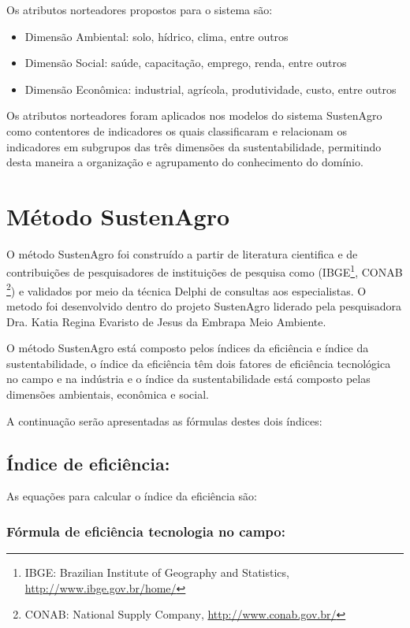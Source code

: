 Os atributos norteadores propostos para o sistema são:
\begin{itemize}
\item Dimensão Ambiental: solo, hídrico, clima, entre outros
\item Dimensão Social: saúde, capacitação, emprego, renda, entre outros
\item Dimensão Econômica: industrial, agrícola, produtividade, custo, entre
outros
\end{itemize}
Os atributos norteadores foram aplicados nos modelos do sistema SustenAgro
como contentores de indicadores os quais classificaram e relacionam
os indicadores em subgrupos das três dimensões da sustentabilidade,
permitindo desta maneira a organização e agrupamento do conhecimento
do domínio.

\section{Método SustenAgro}

O método SustenAgro foi construído a partir de literatura cientifica
e de contribuições de pesquisadores de instituições de pesquisa como
(IBGE\footnote{IBGE: \foreignlanguage{english}{Brazilian Institute of Geography and
Statistics}, \url{http://www.ibge.gov.br/home/}}, CONAB \footnote{CONAB: \foreignlanguage{english}{National Supply Company}, \url{http://www.conab.gov.br/}})
e validados por meio da técnica \foreignlanguage{english}{Delphi}
de consultas aos especialistas. O metodo foi desenvolvido dentro do
projeto SustenAgro liderado pela pesquisadora Dra. Katia Regina Evaristo
de Jesus da Embrapa Meio Ambiente.

O método SustenAgro está composto pelos índices da eficiência e índice
da sustentabilidade, o índice da eficiência têm dois fatores de eficiência
tecnológica no campo e na indústria e o índice da sustentabilidade
está composto pelas dimensões ambientais, econômica e social.

A continuação serão apresentadas as fórmulas destes dois índices:

\subsection*{Índice de eficiência:}

As equações para calcular o índice da eficiência são:

\subsubsection*{Fórmula de eficiência tecnologia no campo:}

